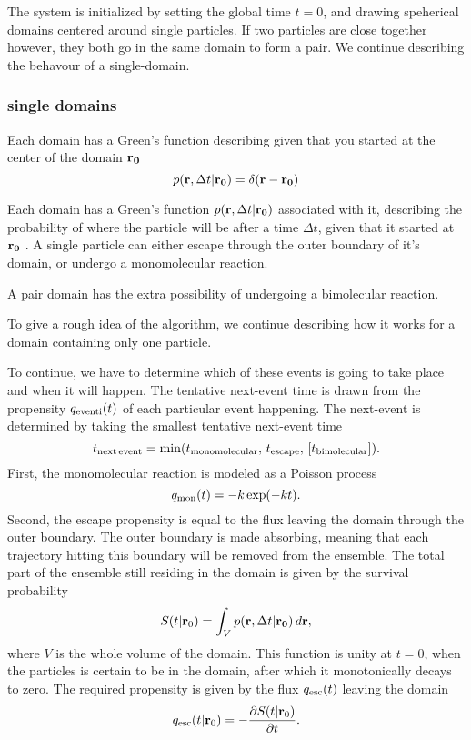 The system is initialized by setting the global time $t=0$, and drawing speherical domains centered around single particles. If two particles are close together however, they both go in the same domain to form a pair. We continue describing the behavour of a single-domain.

\subsubsection{single domains}


Each domain has a Green's function describing given that you started at the center of the domain ${\bf r_0}$
\begin{equation}
 p({\bf r}, \Delta t|{\bf r_0}) = \delta(\mathbf{r - r_0})
\end{equation}


Each domain has a Green's function $p({\bf r}, \Delta t|{\bf r_0})$ associated with it, describing the probability of where the particle will be after a time $\Delta t$, given that it started at ${\bf r_0}$ \cite{Carslaw1959}. A single particle can either escape through the outer boundary of it's domain, or undergo a monomolecular reaction. 


A pair domain has the extra possibility of undergoing a bimolecular reaction.

To give a rough idea of the algorithm, we continue describing how it works for a domain containing only one particle.

 To continue, we have to determine which of these events is going to take place and when it will happen. The tentative next-event time is drawn from the propensity $q_{\rm event i}(t)$ of each particular event happening. The next-event is  determined by taking the smallest tentative next-event time
\begin{equation}
 t_{\rm next\,event} = {\rm min}(t_{\rm monomolecular},\,t_{\rm escape},\,[t_{\rm bimolecular}]).
\end{equation}
First, the monomolecular reaction is modeled as a Poisson process
\begin{equation}
 q_{\rm mon}(t) = -k\, {\rm exp}(-k t).
\end{equation}
Second, the escape propensity is equal to the flux leaving the domain through the outer boundary. The outer boundary is made absorbing, meaning that each trajectory hitting this boundary will be removed from the ensemble. The total part of the ensemble still residing in the domain is given by the survival probability
\begin{equation}
 S(t|{\mathbf r_0}) = \int_V p({\bf r}, \Delta t|{\bf r_0}) \, d{\mathbf r},
 \elabel{Surv}
\end{equation}
where $V$ is the whole volume of the domain. This function is unity at $t=0$, when the particles is certain to be in the domain, after which it monotonically decays to zero. The required propensity is given by the flux $q_{\rm esc}(t)$ leaving the domain
\begin{equation}
 q_{\rm esc}(t|{\mathbf r_0}) = -\frac{\partial S(t|{\mathbf r_0})}{\partial t}.
\end{equation}


